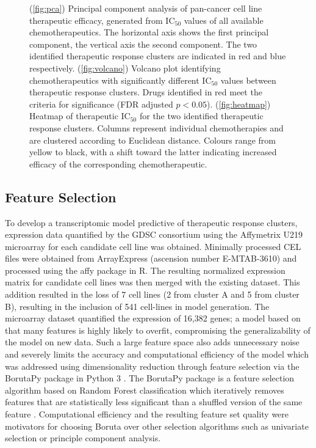 \documentclass[10pt, letterpaper]{article}
\begin{document}
\begin{multicols*}{2}
\begin{figure}[!ht]
    \caption{(\ref{fig:pca}) Principal component analysis of pan-cancer cell line therapeutic efficacy, generated from IC$_{50}$ values of all available chemotherapeutics. The horizontal axis shows the first principal component, the vertical axis the second component. The two identified therapeutic response clusters are indicated in red and blue respectively. (\ref{fig:volcano}) Volcano plot identifying chemotherapeutics with significantly different IC$_{50}$ values between therapeutic response clusters. Drugs identified in red meet the criteria for significance (FDR adjusted $p<0.05$). (\ref{fig:heatmap}) Heatmap of therapeutic IC$_{50}$ for the two identified therapeutic response clusters. Columns represent individual chemotherapies and are clustered according to Euclidean distance. Colours range from yellow to black, with a shift toward the latter indicating increased efficacy of the corresponding chemotherapeutic.}
    \label{fig:clustering}
\end{figure}


\subsection*{Feature Selection}
To develop a transcriptomic model predictive of therapeutic response clusters, expression data quantified by the GDSC consortium using the Affymetrix U219 microarray for each candidate cell line was obtained. Minimally processed CEL files were obtained from ArrayExpress (ascension number E-MTAB-3610) and processed using the affy package in R. The resulting normalized expression matrix for candidate cell lines was then merged with the existing dataset. This addition resulted in the loss of 7 cell lines (2 from cluster A and 5 from cluster B), resulting in the inclusion of 541 cell-lines in model generation. The microarray dataset quantified the expression of 16,382 genes; a model based on that many features is highly likely to overfit, compromising the generalizability of the model on new data. Such a large feature space also adds unnecessary noise and severely limits the accuracy and computational efficiency of the model which was addressed using dimensionality reduction through feature selection via the BorutaPy package in Python 3  \cite{liu}. The BorutaPy package is a feature selection algorithm based on Random Forest classification which iteratively removes features that are statistically less significant than a shuffled version of the same feature \cite{kursa}. Computational efficiency and the resulting feature set quality were motivators for choosing Boruta over other selection algorithms such as univariate selection or principle component analysis.



\end{multicols*}
\end{document}
